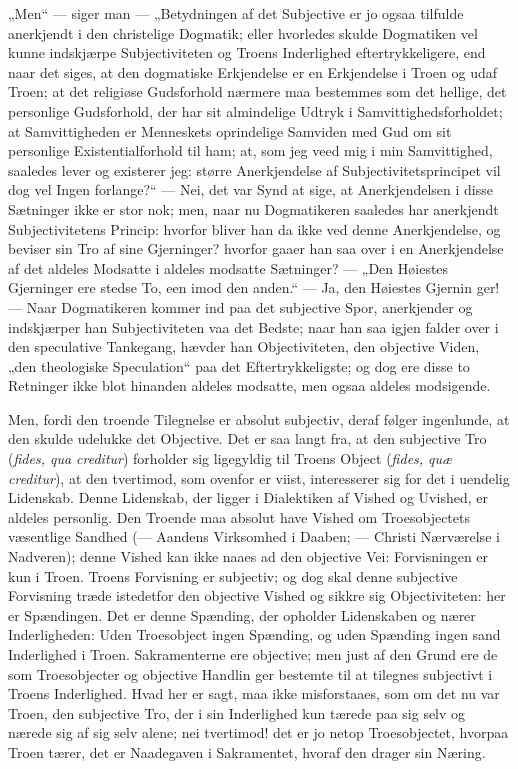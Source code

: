 „Men“ --- siger man --- „Betydningen af det Subjective er jo ogsaa
tilfulde anerkjendt i den christelige Dogmatik; eller hvorledes
skulde Dogmatiken vel kunne indskjærpe Subjectiviteten og Troens
Inderlighed eftertrykkeligere, end naar det siges, at den
dogmatiske Erkjendelse er en Erkjendelse i Troen og udaf Troen; at
det religiøse Gudsforhold nærmere maa bestemmes som det hellige,
det personlige Gudsforhold, der har sit almindelige Udtryk i
Samvittighedsforholdet; at Samvittigheden er Menneskets
oprindelige Samviden med Gud om sit personlige Existentialforhold
til ham; at, som jeg veed mig i min Samvittighed, saaledes lever
og existerer jeg: større Anerkjendelse af
Subjectivitetsprincipet vil dog vel Ingen forlange?“ --- Nei, det
var Synd at sige, at Anerkjendelsen i disse Sætninger ikke er stor
nok; men, naar nu Dogmatikeren saaledes har anerkjendt
Subjectivitetens Princip: hvorfor bliver han da ikke ved denne
Anerkjendelse, og beviser sin Tro af sine Gjerninger? hvorfor
gaaer han saa over i en Anerkjendelse af det aldeles Modsatte i
aldeles modsatte Sætninger? --- „Den Høiestes Gjerninger ere
stedse To, een imod den anden.“ --- Ja, den Høiestes Gjernin%
ger! --- Naar Dogmatikeren kommer ind paa det subjective Spor,
anerkjender og indskjærper han Subjectiviteten vaa det Bedste;
naar han saa igjen falder over i den speculative Tankegang, hævder
han Objectiviteten, den objective Viden, „den theologiske
Speculation“ paa det Eftertrykkeligste; og dog ere disse to
Retninger ikke blot hinanden aldeles modsatte, men ogsaa aldeles
modsigende.

Men, fordi den troende Tilegnelse er absolut subjectiv, deraf
følger ingenlunde, at den skulde udelukke det Objective. Det er
saa langt fra, at den subjective Tro (\textit{fides, qua
creditur}) forholder sig ligegyldig til Troens Object
(\textit{fides, quæ creditur}), at den tvertimod, som ovenfor er
viist, interesserer sig for det i uendelig Lidenskab. Denne
Lidenskab, der ligger i Dialektiken af Vished og Uvished, er
aldeles personlig. Den Troende maa absolut have Vished om
Troesobjectets væsentlige Sandhed (--- Aandens Virksomhed i
Daaben; --- Christi Nærværelse i Nadveren); denne Vished kan ikke
naaes ad den objective Vei: Forvisningen er kun i Troen. Troens
Forvisning er subjectiv; og dog skal denne subjective Forvisning
træde istedetfor den objective Vished og sikkre sig Objectiviteten:
her er Spændingen. Det er denne Spænding, der opholder Lidenskaben
og nærer Inderligheden: Uden Troesobject ingen Spænding, og uden
Spænding ingen sand Inderlighed i Troen. Sakramenterne ere
objective; men just af den Grund ere de som Troesobjecter og
objective Handlin%
ger bestemte til at tilegnes subjectivt i Troens Inderlighed. Hvad
her er sagt, maa ikke misforstaaes, som om det nu var Troen, den
subjective Tro, der i sin Inderlighed kun tærede paa sig selv og
nærede sig af sig selv alene; nei tvertimod! det er jo netop
Troesobjectet, hvorpaa Troen tærer, det er Naadegaven i
Sakramentet, hvoraf den drager sin Næring.

